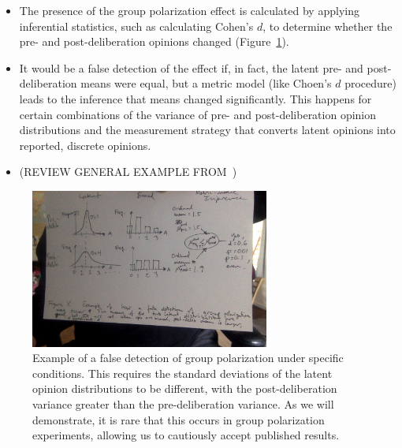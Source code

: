 \documentclass[11pt,letterpaper]{article}
\begin{document}
\begin{itemize}
  \item 
    The presence of the group polarization effect is calculated
    by applying inferential statistics, such as calculating Cohen's $d$, to
    determine whether the pre- and post-deliberation opinions changed
    (Figure~\ref{fig:falseInferenceDiagram}).
  \item
    It would be a false detection of the effect if, in fact, the latent pre- and
    post-deliberation means were equal, but a metric model (like Choen's $d$
    procedure) leads to the inference that means changed significantly. 
    This happens for certain combinations of the 
    variance of pre- and post-deliberation opinion distributions and the
    measurement strategy that converts latent opinions into reported, discrete
    opinions.
  \item
    (REVIEW GENERAL EXAMPLE FROM~\cite{Liddell2018})
\end{itemize}

\begin{figure}
  \centering
  \includegraphics[width=0.7\textwidth]{Figures/FalseInferenceDiagram.jpg}

  \caption{Example of a false detection of group polarization under specific
  conditions. This requires the standard deviations of the latent opinion
  distributions to be different, with the post-deliberation variance greater
  than the pre-deliberation variance. As we will demonstrate, it is rare that
  this occurs in group polarization experiments, allowing us to cautiously accept
  published results.}\label{fig:falseInferenceDiagram}
\end{figure}
\end{document}
